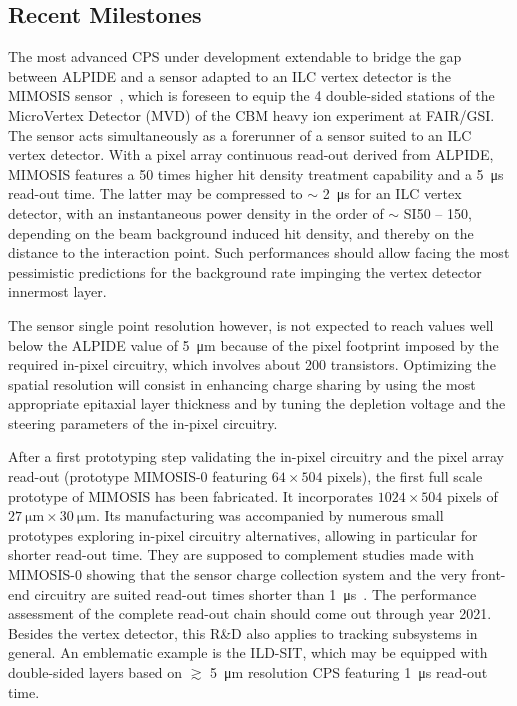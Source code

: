 \subsection{Recent Milestones}
The most advanced CPS under development extendable to bridge the 
gap between ALPIDE and a sensor adapted to an ILC vertex detector 
is the MIMOSIS sensor~\cite{Morel:mimosis}, which is foreseen to 
equip the 4 double-sided stations of the MicroVertex Detector (MVD) 
of the CBM heavy ion experiment at FAIR/GSI. The sensor acts 
simultaneously as a forerunner of a sensor suited to an ILC vertex 
detector. With a pixel array continuous read-out derived from ALPIDE, 
MIMOSIS features a 50 times higher hit density treatment capability 
and a \SI{5}{\micro\second} read-out time. The latter may be compressed to 
$\sim$ \SI{2}{\micro\second} for an ILC vertex detector, with an instantaneous 
power density in the order of $\sim$ SI{50 -- 150}{\mili\watt\per\centimeter\squared}, depending 
on the beam background induced hit density, and thereby on the 
distance to the interaction point. Such performances should allow 
facing the most pessimistic predictions for the background rate 
impinging the vertex detector innermost layer. 

The sensor single point resolution however, is not expected to reach
values well below the ALPIDE value of \SI{5}{\micro\meter} because of the pixel 
footprint imposed by the required in-pixel circuitry, which involves 
about 200 transistors. Optimizing the spatial resolution will consist 
in enhancing charge sharing by using the most appropriate epitaxial 
layer thickness and by tuning the depletion voltage and the steering 
parameters of the in-pixel circuitry. 

After a first prototyping step validating the in-pixel circuitry and the 
pixel array read-out (prototype MIMOSIS-0 featuring $64 \times 504$ pixels), 
the first full scale prototype of MIMOSIS has been fabricated. It 
incorporates $1024 \times 504$ pixels of $\SI{27}{\micro\meter} \times \SI{30}{\micro\meter}$. Its manufacturing 
was accompanied by numerous small prototypes exploring in-pixel circuitry alternatives, allowing in particular for shorter read-out time. They 
are supposed to complement studies made with MIMOSIS-0 showing that the 
sensor charge collection system and the very front-end circuitry are 
suited read-out times shorter than \SI{1}{\micro\second}~\cite{DEVEAUX2020162653}. 
The performance assessment of the complete read-out chain should come 
out through year 2021. Besides the vertex detector, this R\&D also 
applies to tracking subsystems in general. An emblematic example is 
the ILD-SIT, which may be equipped with double-sided layers based on 
$\gtrsim$ \SI{5}{\micro\meter} resolution CPS featuring \SI{1}{\micro\second} read-out time.

